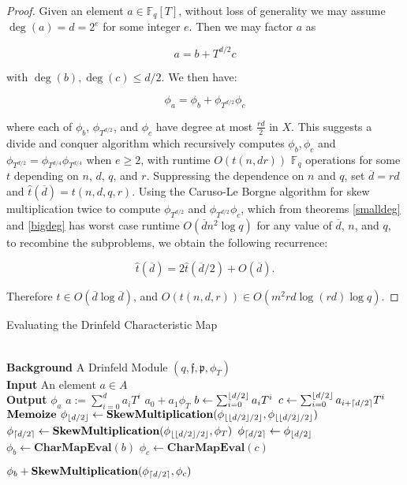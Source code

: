 \documentclass{jams-l}
\theoremstyle{remark}
\numberwithin{equation}{section}
\newcommand{\frakf}{\mathfrak{f}}
\DeclarePairedDelimiter\ceil{\lceil}{\rceil}
\DeclarePairedDelimiter\floor{\lfloor}{\rfloor}
\begin{document}
\begin{proof}
Given an element $a \in \mathbb{F}_q[T]$, without loss of generality we may assume $\deg(a) = d = 2^{e}$ for some integer $e$. Then we may factor $a$ as

\[a = b + T^{d/2} c \] 

\noindent with $\deg(b), \deg(c) \leq d/2$. We then have:

\[\phi_a = \phi_b + \phi_{T^{d/2}} \phi_c\]

\noindent where each of $\phi_b$, $\phi_{T^{d/2}}$, and $\phi_c$ have degree at most $\frac{rd}{2}$ in $X$. This suggests a divide and conquer algorithm which recursively computes $\phi_b, \phi_c$ and $\phi_{T^{d/2}} = \phi_{T^{d/4}}\phi_{T^{d/4}}$ when $e \geq 2$, with runtime $O(t(n,dr))$ $\mathbb{F}_q$ operations for some $t$ depending on $n$, $d$, $q$, and $r$. Suppressing the dependence on $n$ and $q$, set $\overline{d} = rd$ and $\hat{t}(\overline{d}) = t(n, d, q, r)$. Using the Caruso-Le Borgne algorithm for skew multiplication twice to compute $\phi_{T^{d/2}}$ and $\phi_{T^{d/2}} \phi_c$, which from theorems \ref{smalldeg} and \ref{bigdeg} has worst case runtime $O(\overline{d}n^2 \log q)$ for any value of $\overline{d}$, $n$, and $q$, to recombine the subproblems, we obtain the following recurrence:

\[ \hat{t}(\overline{d}) = 2 \hat{t}(\overline{d}/2) + O(\overline{d}).\]

\noindent Therefore $\hat{t} \in O( \overline{d} \log \overline{d})$, and $O(t(n,d,r)) \in O(m^2 rd \log (rd) \log q)$.

\end{proof}

\begin{algorithm}
\caption{Evaluating the Drinfeld Characteristic Map}\label{charmap}
\begin{algorithmic}[1]
 \\
 \hspace*{\algorithmicindent} \textbf{Background} A Drinfeld Module $(q,\frakf,\mathfrak{p}, \phi_T)$ \\
 \hspace*{\algorithmicindent} \textbf{Input} An element $a \in A$ \\
 \hspace*{\algorithmicindent} \textbf{Output} $\phi_a$
 \State $a := \sum_{i=0}^d a_i T^i$
 \Return $a_0 + a_1 \phi_T$
 \EndIf
 \State $b \gets \sum_{i=0}^{\floor{d/2}}a_iT^i$
 \State $c \gets \sum_{i = 0}^{\floor{d/2}}a_{i + \ceil{d/2}} T^i$
 \State $\textbf{Memoize } \phi_{\floor{d/2}} \gets \textbf{SkewMultiplication}(\phi_{\floor{\floor{d/2}/2}}, \phi_{\floor{\floor{d/2}/2}}) $
\State $\phi_{\ceil{d/2}} \gets \textbf{SkewMultiplication}(\phi_{\floor{\floor{d/2}/2}}, \phi_{T}) $
\Else 
\State $\phi_{\ceil{d/2}} \gets \phi_{\floor{d/2}}$ 
\EndIf
\State $\phi_b \gets \textbf{CharMapEval}(b)$
\State $\phi_c \gets \textbf{CharMapEval}(c)$

 \Return $\phi_b + \textbf{SkewMultiplication}(\phi_{\ceil{d/2}}, \phi_c)$

\EndProcedure
\end{algorithmic}
\end{algorithm}
\end{document}
